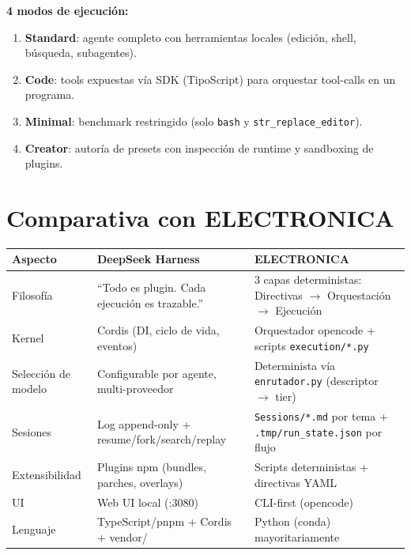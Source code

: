\documentclass[11pt,a4paper]{article}
\begin{document}
\begin{tcolorbox}[cajaTitulo, title={\faIcon{cube}~Los 4 modos de ejecución}]
\textbf{4 modos de ejecución:}
\begin{enumerate}[leftmargin=*]
  \item \textbf{Standard}: agente completo con herramientas locales (edición, shell, búsqueda, subagentes).
  \item \textbf{Code}: tools expuestas vía SDK (TipoScript) para orquestar tool-calls en un programa.
  \item \textbf{Minimal}: benchmark restringido (solo \texttt{bash} y \texttt{str\_replace\_editor}).
  \item \textbf{Creator}: autoría de presets con inspección de runtime y sandboxing de plugins.
\end{enumerate}
\end{tcolorbox}

\section{Comparativa con ELECTRONICA}

\begin{table}[htbp]
\centering
\small
\begin{tabularx}{\linewidth}{>{\raggedright\arraybackslash}p{3.2cm} X X}
\toprule
\textbf{Aspecto} & \textbf{DeepSeek Harness} & \textbf{ELECTRONICA} \\
\midrule
Filosofía & ``Todo es plugin. Cada ejecución es trazable.'' & 3 capas deterministas: Directivas $\rightarrow$ Orquestación $\rightarrow$ Ejecución \\
Kernel & Cordis (DI, ciclo de vida, eventos) & Orquestador opencode + scripts \texttt{execution/*.py} \\
Selección de modelo & Configurable por agente, multi-proveedor & Determinista vía \texttt{enrutador.py} (descriptor $\rightarrow$ tier) \\
Sesiones & Log append-only + resume/fork/search/replay & \texttt{Sessions/*.md} por tema + \texttt{.tmp/run\_state.json} por flujo \\
Extensibilidad & Plugins npm (bundles, parches, overlays) & Scripts deterministas + directivas YAML \\
UI & Web UI local (:3080) & CLI-first (opencode) \\
Lenguaje & TypeScript/pnpm + Cordis + vendor/ & Python (conda) mayoritariamente \\
\bottomrule
\end{tabularx}
\end{table}
\end{document}
